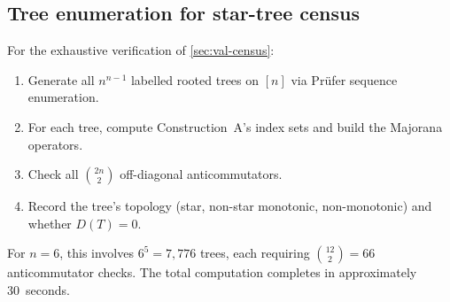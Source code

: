 \subsection*{Tree enumeration for star-tree census}

For the exhaustive verification of \cref{sec:val-census}:
\begin{enumerate}
  \item Generate all $n^{n-1}$ labelled rooted trees on $[n]$ via
    Pr\"ufer sequence enumeration.
  \item For each tree, compute Construction~A's index sets and
    build the Majorana operators.
  \item Check all $\binom{2n}{2}$ off-diagonal anticommutators.
  \item Record the tree's topology (star, non-star monotonic,
    non-monotonic) and whether $D(T) = 0$.
\end{enumerate}

For $n = 6$, this involves $6^5 = 7{,}776$ trees, each requiring
$\binom{12}{2} = 66$ anticommutator checks.  The total computation
completes in approximately 30~seconds.

